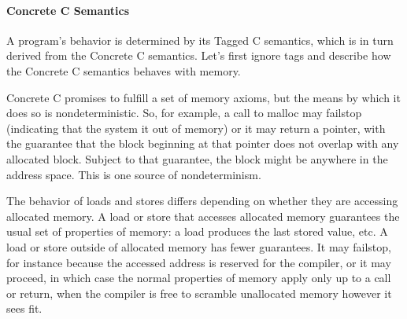 \documentclass{article}
\begin{document}


\paragraph{Concrete C Semantics}

A program's behavior is determined by its Tagged C semantics, which is in turn derived from the
Concrete C semantics. Let's first ignore tags and describe how the Concrete C semantics behaves
with memory.

Concrete C promises to fulfill a set of memory axioms, but the means by which it does so
is nondeterministic. So, for example, a call to malloc may failstop (indicating that the system
it out of memory) or it may return a pointer, with the guarantee that the block beginning at
that pointer does not overlap with any allocated block. Subject to that guarantee, the block
might be anywhere in the address space. This is one source of nondeterminism.

The behavior of loads and stores differs depending on whether they are accessing allocated memory.
A load or store that accesses allocated memory guarantees the usual set of properties of
memory: a load produces the last stored value, etc. A load or store outside of allocated memory
has fewer guarantees. It may failstop, for instance because the accessed address is reserved for
the compiler, or it may proceed, in which case the normal properties of memory apply only up to
a call or return, when the compiler is free to scramble unallocated memory however it sees fit.

\end{document}
